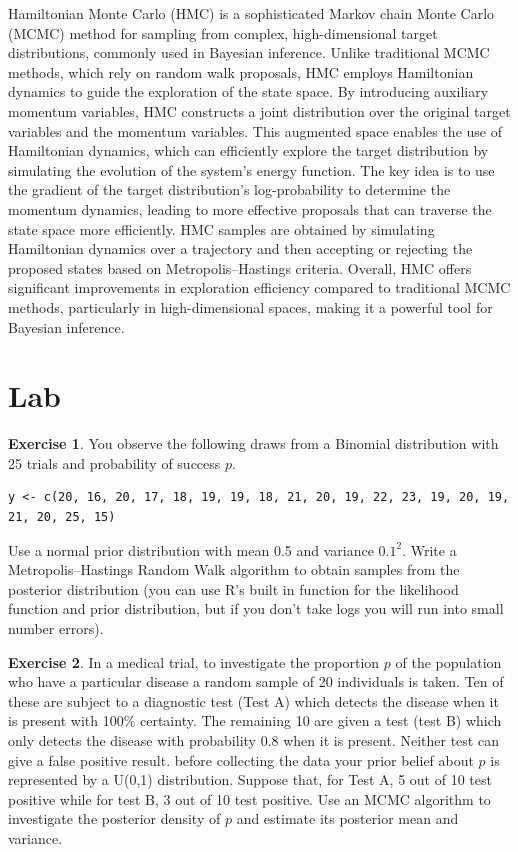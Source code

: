\documentclass[
]{book}
\theoremstyle{definition}
\theoremstyle{definition}
\theoremstyle{definition}
\newtheorem{exercise}{Exercise}[chapter]
\theoremstyle{definition}
\theoremstyle{remark}
\begin{document}
Hamiltonian Monte Carlo (HMC) is a sophisticated Markov chain Monte Carlo (MCMC) method for sampling from complex, high-dimensional target distributions, commonly used in Bayesian inference. Unlike traditional MCMC methods, which rely on random walk proposals, HMC employs Hamiltonian dynamics to guide the exploration of the state space. By introducing auxiliary momentum variables, HMC constructs a joint distribution over the original target variables and the momentum variables. This augmented space enables the use of Hamiltonian dynamics, which can efficiently explore the target distribution by simulating the evolution of the system's energy function. The key idea is to use the gradient of the target distribution's log-probability to determine the momentum dynamics, leading to more effective proposals that can traverse the state space more efficiently. HMC samples are obtained by simulating Hamiltonian dynamics over a trajectory and then accepting or rejecting the proposed states based on Metropolis--Hastings criteria. Overall, HMC offers significant improvements in exploration efficiency compared to traditional MCMC methods, particularly in high-dimensional spaces, making it a powerful tool for Bayesian inference.

\hypertarget{lab-2}{%
\section{Lab}\label{lab-2}}

\begin{exercise}
You observe the following draws from a Binomial distribution with 25 trials and probability of success \(p\).

\begin{verbatim}
y <- c(20, 16, 20, 17, 18, 19, 19, 18, 21, 20, 19, 22, 23, 19, 20, 19, 21, 20, 25, 15)
\end{verbatim}

Use a normal prior distribution with mean 0.5 and variance \(0.1^2\). Write a Metropolis--Hastings Random Walk algorithm to obtain samples from the posterior distribution (you can use R's built in function for the likelihood function and prior distribution, but if you don't take logs you will run into small number errors).
\end{exercise}

\begin{exercise}
In a medical trial, to investigate the proportion \(p\) of the population who have a particular disease a random sample of 20 individuals is taken. Ten of these are subject to a diagnostic test (Test A) which detects the disease when it is present with 100\% certainty. The remaining 10 are given a test (test B) which only detects the disease with probability 0.8 when it is present. Neither test can give a false positive result. before collecting the data your prior belief about \(p\) is represented by a U(0,1) distribution. Suppose that, for Test A, 5 out of 10 test positive while for test B, 3 out of 10 test positive. Use an MCMC algorithm to investigate the posterior density of \(p\) and estimate its posterior mean and variance.
\end{exercise}
\end{document}
